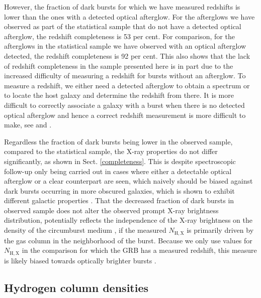 \documentclass[longauth]{aa}    %
\begin{document}
However, the fraction of dark bursts for which we have measured redshifts is
lower than the ones with a detected optical afterglow. For the afterglows we
have observed as part of the statistical sample that do not have a detected
optical afterglow, the redshift completeness is 53 per cent. For comparison, for
the afterglows in the statistical sample we have observed with an optical
afterglow detected, the redshift completeness is 92 per cent. This also shows
that the lack of redshift completeness in the sample presented here is in part
due to the increased difficulty of measuring a redshift for bursts without an
afterglow. To measure a redshift, we either need a detected afterglow to obtain
a spectrum or to locate the host galaxy and determine the redshift from there.
It is more difficult to correctly associate a galaxy with a burst when there is
no detected optical afterglow and hence a correct redshift measurement is more
difficult to make, see \citet{Jakobsson2005, Levesque2010} and
\citet{Perley2017}.

Regardless the fraction of dark bursts being lower in the observed sample,
compared to the statistical sample, the X-ray properties do not differ
significantly, as shown in Sect. \ref{completeness}. This is despite
spectroscopic follow-up only being carried out in cases where either a
detectable optical afterglow or a clear counterpart are seen, which naively
should be biased against dark bursts occurring in more obscured galaxies, which
is shown to exhibit different galactic properties \citep{Perley2009,
	Kruhler2011, Rossi2012, Perley2013b, Perley2015b}. That the decreased fraction
of dark bursts in observed sample does not alter the observed prompt X-ray
brightness distribution, potentially reflects the independence of the X-ray
brightness on the density of the circumburst medium \citep{Freedman2001,
	Berger2003, Nysewander2009}, if the measured $N_{\mathrm{H, X}}$ is primarily
driven by the gas column in the neighborhood of the burst. Because we only use
values for $N_{\mathrm{H, X}}$ in the comparison for which the GRB has a
measured redshift, this measure is likely biased towards optically brighter
bursts \citep[e.g.][]{Watson2012}.

 \subsection{Hydrogen column densities}
\end{document}
